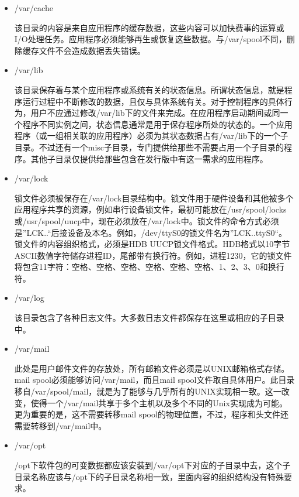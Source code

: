 \begin{itemize}
	\begin{itemize}
		\item /var/cache
		
		\qquad 该目录的内容是来自应用程序的缓存数据，这些内容可以加快费事的运算或I/O处理任务。应用程序必须能够再生或恢复这些数据。与/var/spool不同，删除缓存文件不会造成数据丢失错误。

		\item /var/lib
		
		\qquad 该目录保存着与某个应用程序或系统有关的状态信息。所谓状态信息，就是程序运行过程中不断修改的数据，且仅与具体系统有关。对于控制程序的具体行为，用户不应通过修改/var/lib下的文件来完成。在应用程序启动期间或同一个程序不同实例之间，状态信息通常是用于保存程序所处的状态的。一个应用程序（或一组相关联的应用程序）必须为其状态数据占有/var/lib下的一个子目录。不过还有一个misc子目录，专门提供给那些不需要占用一个子目录的程序。其他子目录仅提供给那些包含在发行版中有这一需求的应用程序。
		
		\item /var/lock
		
		\qquad 锁文件必须被保存在/var/lock目录结构中。锁文件用于硬件设备和其他被多个应用程序共享的资源，例如串行设备锁文件，最初可能放在/usr/spool/locks或/usr/spool/uucp中，现在必须放在/var/lock中。锁文件的命令方式必须是”LCK..“后接设备及本名。例如，/dev/ttyS0的锁文件名为”LCK..ttyS0“。锁文件的内容组织格式，必须是HDB UUCP锁文件格式。HDB格式以10字节ASCII数值字符储存进程ID，尾部带有换行符。例如，进程1230，它的锁文件将包含11字符：空格、空格、空格、空格、空格、空格、1、2、3、0和换行符。
		
		\item /var/log
		
		\qquad 该目录包含了各种日志文件。大多数日志文件都保存在这里或相应的子目录中。
		
		\item /var/mail
		
		\qquad 此处是用户邮件文件的存放处，所有邮箱文件必须是以UNIX邮箱格式存储。mail spool必须能够访问/var/mail，而且mail spool文件取自具体用户。此目录移自/var/spool/mail，就是为了能够与几乎所有的UNIX实现相一致。这一改变，使得一个/var/mail共享于多个主机以及多个不同的Unix实现成为可能。更为重要的是，这不需要转移mail spool的物理位置，不过，程序和头文件还需要转移到/var/mail中。
		
		\item /var/opt
		
		\qquad /opt下软件包的可变数据都应该安装到/var/opt下对应的子目录中去，这个子目录名称应该与/opt下的子目录名称相一致，里面内容的组织结构没有特殊要求。
		

\end{itemize}
\end{itemize}
